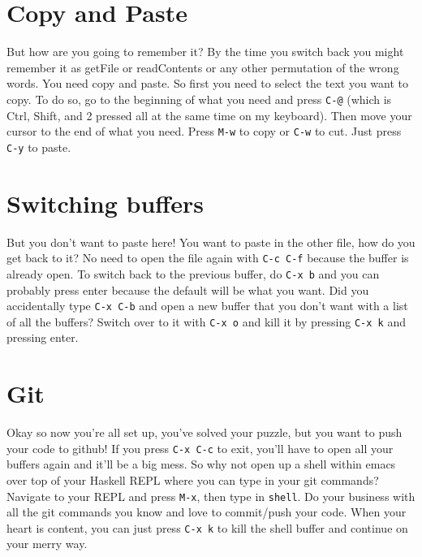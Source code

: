 \documentclass[12pt]{article}
\begin{document}
\section{Copy and Paste}\label{copy-and-paste}

But how are you going to remember it? By the time you switch back you
might remember it as getFile or readContents or any other permutation of
the wrong words. You need copy and paste. So first you need to select
the text you want to copy. To do so, go to the beginning of what you
need and press \texttt{C-@} (which is Ctrl, Shift, and 2 pressed all at
the same time on my keyboard). Then move your cursor to the end of what
you need. Press \texttt{M-w} to copy or \texttt{C-w} to cut. Just press
\texttt{C-y} to paste.

\section{Switching buffers}\label{switching-buffers}

But you don't want to paste here! You want to paste in the other file,
how do you get back to it? No need to open the file again with
\texttt{C-c\ C-f} because the buffer is already open. To switch back to
the previous buffer, do \texttt{C-x\ b} and you can probably press enter
because the default will be what you want. Did you accidentally type
\texttt{C-x\ C-b} and open a new buffer that you don't want with a list
of all the buffers? Switch over to it with \texttt{C-x\ o} and kill it
by pressing \texttt{C-x\ k} and pressing enter.

\section{Git}\label{git}

Okay so now you're all set up, you've solved your puzzle, but you want
to push your code to github! If you press \texttt{C-x\ C-c} to exit,
you'll have to open all your buffers again and it'll be a big mess. So
why not open up a shell within emacs over top of your Haskell REPL where
you can type in your git commands? Navigate to your REPL and press
\texttt{M-x}, then type in \texttt{shell}. Do your business with all the
git commands you know and love to commit/push your code. When your heart
is content, you can just press \texttt{C-x\ k} to kill the shell buffer
and continue on your merry way.
\end{document}
